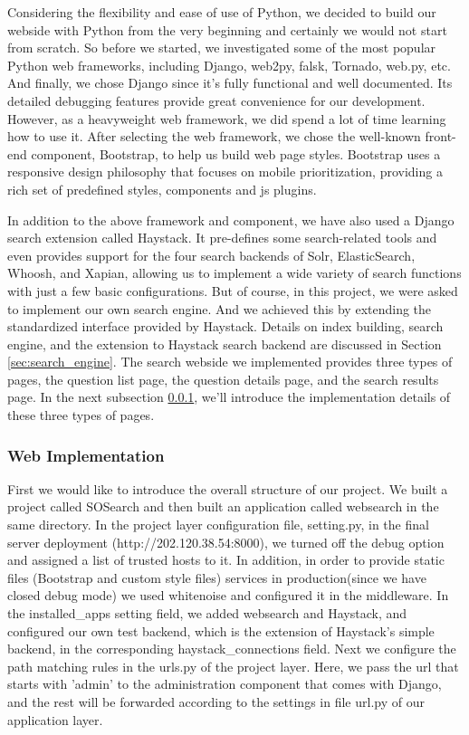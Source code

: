 \documentclass[10pt,journal,compsoc]{IEEEtran}
\begin{document}
Considering the flexibility and ease of use of Python, we decided to build our webside with Python from the very beginning and certainly we would not start from scratch. So before we started, we investigated some of the most popular Python web frameworks, including Django, web2py, falsk, Tornado, web.py, etc. And finally, we chose Django \cite{holovaty2009definitive} since it's fully functional and well documented. Its detailed debugging features provide great convenience for our development. However, as a heavyweight web framework, we did spend a lot of time learning how to use it. After selecting the web framework, we chose the well-known front-end component, Bootstrap, to help us build web page styles. Bootstrap uses a responsive design philosophy that focuses on mobile prioritization, providing a rich set of predefined styles, components and js plugins.

In addition to the above framework and component, we have also used a Django search extension called Haystack. It pre-defines some search-related tools and even provides support for the four search backends of Solr, ElasticSearch, Whoosh, and Xapian, allowing us to implement a wide variety of search functions with just a few basic configurations. But of course, in this project, we were asked to implement our own search engine. And we achieved this by extending the standardized  interface provided by Haystack. Details on index building, search engine, and the extension to Haystack search backend are discussed in Section \ref{sec:search_engine}. The search webside we implemented provides three types of pages, the question list page, the question details page, and the search results page. In the next subsection \ref{subsubsec:web_implementation}, we'll introduce the implementation details of these three types of pages.

\subsubsection{Web Implementation}
\label{subsubsec:web_implementation}

First we would like to introduce the overall structure of our project. We built a project called SOSearch and then built an application called websearch in the same directory. In the project layer configuration file, setting.py, in the final server deployment (http://202.120.38.54:8000), we turned off the debug option and assigned a list of trusted hosts to it. In addition, in order to provide static files (Bootstrap and custom style files) services in production(since we have closed debug mode) we used whitenoise and configured it in the middleware. In the installed\_apps setting field, we added websearch and Haystack, and configured our own test backend, which is the extension of Haystack's simple backend, in the corresponding haystack\_connections field. Next we configure the path matching rules in the urls.py of the project layer. Here, we pass the url that starts with 'admin' to the administration component that comes with Django, and the rest will be forwarded according to the settings in file url.py of our application layer. 
\end{document}
